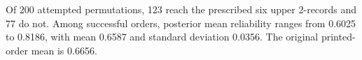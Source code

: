 Of 200 attempted permutations, 123 reach the prescribed six upper 2-records and 77 do not. Among successful orders, posterior mean reliability ranges from 0.6025 to 0.8186, with mean 0.6587 and standard deviation 0.0356. The original printed-order mean is 0.6656.
